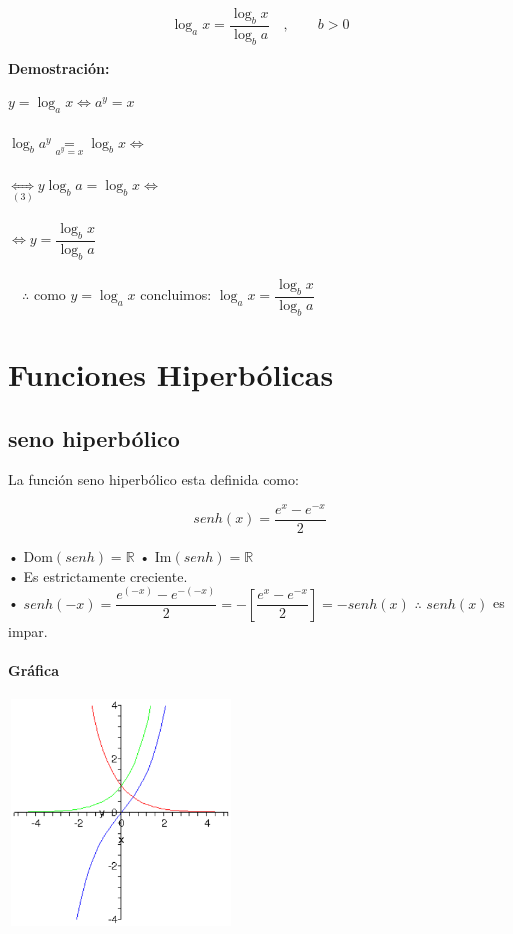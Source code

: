 $$\log _a x = \dfrac{\log _b x}{\log _b a} \quad, \qquad b>0$$

\quad \textbf{Demostración:}
\begin{center}
$y= \log _a x \Leftrightarrow a^y=x$\\
\qquad \\
$\log _b a^y \underset{a^y =x}{=} \log _b x \Leftrightarrow$\\
\qquad \\
$\underset{(3)}{\Leftrightarrow} y \log _b a = \log _b x \Leftrightarrow$\\
\qquad \\
$\Leftrightarrow y = \dfrac{\log _b x}{\log _b a}$\\
\qquad \\
$ $ \qquad $ $ \qquad $ $ \qquad $\therefore$ como $y=\log _a x $ concluimos: $\log _a x =  \dfrac{\log _b x}{\log _b a}$
\end{center}

\section{Funciones Hiperbólicas}

\subsection{seno hiperbólico}

La función seno hiperbólico esta definida como:

$$senh(x)=\dfrac{e^x-e^{-x}}{2}$$

• Dom$(senh) = \mathbb{R}$ \qquad  • Im$(senh) = \mathbb{R}$\\

• Es estrictamente creciente.\\

• $senh(-x) = \dfrac{e^{(-x)}-e^{-(-x)}}{2} = - \left[\dfrac{e^x-e^{-x}}{2} \right] = -senh(x)$ \qquad $\therefore$ $senh(x)$ es impar.

\paragraph{Gráfica}
\begin{center}
\includegraphics[height=6cm,width=6cm]{senh.eps}
\end{center}

